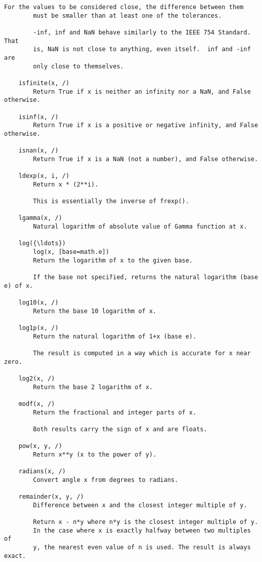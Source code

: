 \documentclass[11pt]{article}
\begin{document}
\begin{Verbatim}[commandchars=\\\{\}]
        For the values to be considered close, the difference between them
        must be smaller than at least one of the tolerances.
        
        -inf, inf and NaN behave similarly to the IEEE 754 Standard.  That
        is, NaN is not close to anything, even itself.  inf and -inf are
        only close to themselves.
    
    isfinite(x, /)
        Return True if x is neither an infinity nor a NaN, and False otherwise.
    
    isinf(x, /)
        Return True if x is a positive or negative infinity, and False otherwise.
    
    isnan(x, /)
        Return True if x is a NaN (not a number), and False otherwise.
    
    ldexp(x, i, /)
        Return x * (2**i).
        
        This is essentially the inverse of frexp().
    
    lgamma(x, /)
        Natural logarithm of absolute value of Gamma function at x.
    
    log({\ldots})
        log(x, [base=math.e])
        Return the logarithm of x to the given base.
        
        If the base not specified, returns the natural logarithm (base e) of x.
    
    log10(x, /)
        Return the base 10 logarithm of x.
    
    log1p(x, /)
        Return the natural logarithm of 1+x (base e).
        
        The result is computed in a way which is accurate for x near zero.
    
    log2(x, /)
        Return the base 2 logarithm of x.
    
    modf(x, /)
        Return the fractional and integer parts of x.
        
        Both results carry the sign of x and are floats.
    
    pow(x, y, /)
        Return x**y (x to the power of y).
    
    radians(x, /)
        Convert angle x from degrees to radians.
    
    remainder(x, y, /)
        Difference between x and the closest integer multiple of y.
        
        Return x - n*y where n*y is the closest integer multiple of y.
        In the case where x is exactly halfway between two multiples of
        y, the nearest even value of n is used. The result is always exact.
    

\end{Verbatim}
\end{document}
